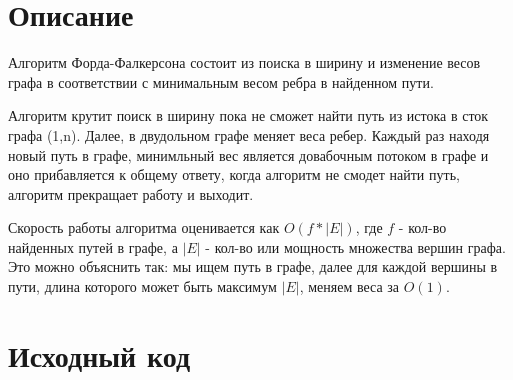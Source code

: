 \section{Описание}

Алгоритм Форда-Фалкерсона состоит из поиска в ширину и изменение весов графа в соответствии с минимальным весом ребра в найденном пути.

Алгоритм крутит поиск в ширину пока не сможет найти путь из истока в сток графа (1,n). Далее, в двудольном графе меняет веса ребер. Каждый раз находя новый путь в графе, минимльный вес является довабочным потоком в графе и оно прибавляется к общему ответу, когда алгоритм не смодет найти путь, алгоритм прекращает работу и выходит.

Скорость работы алгоритма оценивается как $O(f * |E|)$, где $f$ - кол-во найденных путей в графе, а $|E|$ - кол-во или мощность множества вершин графа. Это можно объяснить так: мы ищем путь в графе, далее для каждой вершины в пути, длина которого может быть максимум $|E|$, меняем веса за $O(1)$.

\pagebreak

\section{Исходный код}

